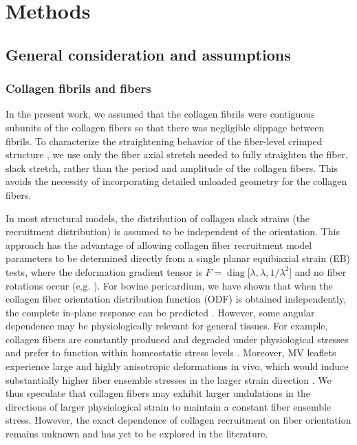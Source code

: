 \section{Methods}

\subsection{General consideration and assumptions}\label{sec:generalconsiderations}

\subsubsection{Collagen fibrils and fibers} \label{sec:collagenconsiderations}

    In the present work, we assumed that the collagen fibrils were contiguous subunits of the collagen fibers so that there was negligible slippage between fibrils. To characterize the straightening behavior of the fiber-level crimped structure \cite{lanir_constitutive_1983, fata_insights_2014, sacks_incorporation_2003, lanir_structural_1979, kastelic_structural_1980, hansen_recruitment_2002, cacho_constitutive_2007, grytz_constitutive_2009}, we use only the fiber axial stretch needed to fully straighten the fiber, slack stretch, rather than the period and amplitude of the collagen fibers. This avoids the necessity of incorporating detailed unloaded geometry for the collagen fibers.


    In most structural models, the distribution of collagen slack strains (the recruitment distribution) is assumed to be independent of the orientation. This approach has the advantage of allowing collagen fiber recruitment model parameters to be determined directly from a single planar equibiaxial strain (EB) tests, where the deformation gradient tensor is $F = \operatorname{diag}[\lambda, \lambda, 1/\lambda^2$] and no fiber rotations occur (e.g. \cite{fata_insights_2014}). For bovine pericardium, we have shown that when the collagen fiber orientation distribution function (ODF) is obtained independently, the complete in-plane response can be predicted \cite{sacks_incorporation_2003}. However, some angular dependence may be physiologically relevant for general tissues. For example, collagen fibers are constantly produced and degraded under physiological stresses and prefer to function within homeostatic stress levels \cite{humphrey_cardiovascular_2002}. Moreover, MV leaflets experience large and highly anisotropic deformations in vivo, which would induce substantially higher fiber ensemble stresses in the larger strain direction \cite{amini_vivo_2012,sacks_vivo_2006}. We thus speculate that collagen fibers may exhibit larger undulations in the directions of larger physiological strain to maintain a constant fiber ensemble stress. However, the exact dependence of collagen recruitment on fiber orientation remains unknown and has yet to be explored in the literature.

